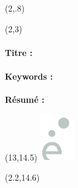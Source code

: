 \begin{textblock}{10}(2,.8)
\logoED
\end{textblock}


\begin{textblock}{13}(2,3)
\paragraph{Titre : \PhDTitleFR} 
\paragraph{Keywords : }\PhDkeywordsFR  \bigskip

\textbf{R\'esum\'e :} \PhDsumFR 
\end{textblock}


\begin{textblock}{13}(13,14.5)
\includegraphics[height=2cm]{logo/logoEgrey.png}
\end{textblock}
\parindent=0pt 



\begin{textblock}{10}(2.2,14.6)

\end{textblock}



